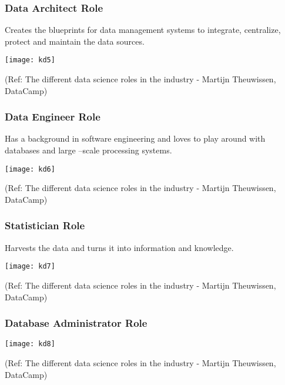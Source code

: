 \begin{frame}[fragile]\frametitle{Data Architect Role}
Creates the blueprints for data management systems to integrate, centralize, protect and maintain the data sources. 

\begin{center}
\texttt{[image: kd5]}
\end{center}

{\tiny (Ref: The different data science roles in the industry - Martijn Theuwissen, DataCamp)}
\end{frame}


\begin{frame}[fragile]\frametitle{Data Engineer Role}
Has a background in software engineering and loves to play around with databases and large –scale processing systems.

\begin{center}
\texttt{[image: kd6]}
\end{center}

{\tiny (Ref: The different data science roles in the industry - Martijn Theuwissen, DataCamp)}
\end{frame}

\begin{frame}[fragile]\frametitle{Statistician Role}
Harvests the data and turns it into information and knowledge.

\begin{center}
\texttt{[image: kd7]}
\end{center}

{\tiny (Ref: The different data science roles in the industry - Martijn Theuwissen, DataCamp)}
\end{frame}

\begin{frame}[fragile]\frametitle{Database Administrator Role}

\begin{center}
\texttt{[image: kd8]}
\end{center}

{\tiny (Ref: The different data science roles in the industry - Martijn Theuwissen, DataCamp)}
\end{frame}

